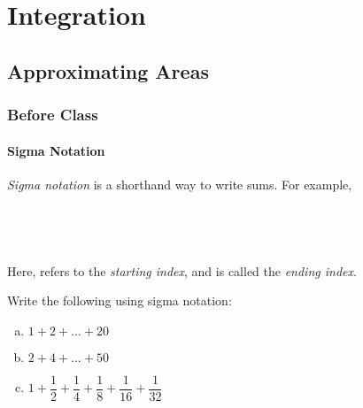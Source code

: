 \documentclass[notes]{subfiles}
\begin{document}
	\chapter{Integration}
	\setcounter{section}{1}
	\fancyhead[LO,RE]{\bfseries \currentname}
	\fancyfoot[C]{{}}
	\fancyfoot[LO,RE]{\large \thepage}	%

\section*{Approximating Areas}\label{cs51}
	\subsection*{Before Class}
	\subsubsection*{Sigma Notation}
		\begin{rmk}
			\emph{Sigma notation} is a shorthand way to write sums.  For example,
				\\ \\ \\ \\ \\
			Here, refers to the \emph{starting index}, and  is called the \emph{ending index}.  
		\end{rmk}
		
		\begin{ex}
			Write the following using sigma notation:
			\begin{enumerate}[(a)]
				\item \(1 + 2 + ... + 20\)
					
				\item \(2 + 4 + ... + 50\)
					
				\item \(1 + \dfrac{1}{2} + \dfrac{1}{4} + \dfrac{1}{8} + \dfrac{1}{16} + \dfrac{1}{32}\)
			\end{enumerate}
		\end{ex}
			\newpage
			
\end{document}
